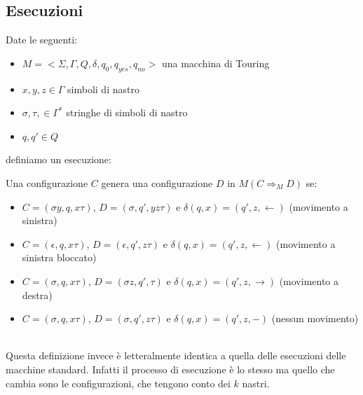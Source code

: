 \subsection{Esecuzioni}
Date le seguenti:
\begin{itemize}[label =--]
    \item $M  = < \Sigma, \Gamma, Q, \delta, q_0,q_{yes},q_{no}>$ una macchina di Touring 
    \item $x,y,z \in \Gamma$ simboli di nastro 
    \item $\sigma,\tau,\in \Gamma^*$ stringhe di simboli di nastro
    \item $q,q' \in Q$
\end{itemize}
definiamo un esecuzione:\smallskip\\
\colorbox{SALZO}{\parbox{\dimexpr\linewidth-2\fboxsep}{\begin{definition}
   Una configurazione $C$ genera una configurazione $D$ in $M (C \Rightarrow_M D)$ se:
   \begin{itemize}
    \item $C = (\sigma y, q, x\tau)$, $D = (\sigma, q', yz\tau)$ e $\delta(q,x) = (q',z,\leftarrow)$ (movimento a sinistra)
    \item $C = (\epsilon, q, x\tau)$, $D = (\epsilon, q', z\tau)$ e $\delta(q,x) = (q',z,\leftarrow)$ (movimento a sinistra bloccato)
    \item $C = (\sigma, q, x\tau)$, $D = (\sigma z, q', \tau)$ e $\delta(q,x) = (q',z,\rightarrow)$ (movimento a destra)
    \item $C = (\sigma, q, x\tau)$, $D = (\sigma, q', z\tau)$ e $\delta(q,x) = (q',z,-)$ (nessun movimento)
   \end{itemize}
\end{definition}}}\smallskip\\
Questa definizione invece è letteralmente identica a quella delle esecuzioni delle macchine standard. Infatti il processo di esecuzione è lo stesso
ma quello che cambia sono le configurazioni, che tengono conto dei $k$ nastri.
